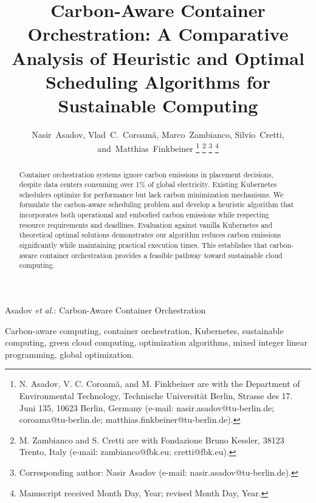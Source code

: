 \documentclass[journal]{IEEEtran}
\begin{document}
\title{Carbon-Aware Container Orchestration: A Comparative Analysis of Heuristic and Optimal Scheduling Algorithms for Sustainable Computing}

\author{Nasir~Asadov,
        Vlad~C.~Coroamă,
        Marco~Zambianco,
        Silvio~Cretti,
        and~Matthias~Finkbeiner%
\thanks{N. Asadov, V. C. Coroamă, and M. Finkbeiner are with the Department
of Environmental Technology, Technische Universität Berlin, Strasse des 17. Juni 135, 10623 Berlin, Germany 
(e-mail: nasir.asadov@tu-berlin.de; coroama@tu-berlin.de; matthias.finkbeiner@tu-berlin.de).}%
\thanks{M. Zambianco and S. Cretti are with Fondazione Bruno Kessler,
38123 Trento, Italy (e-mail: zambianco@fbk.eu; cretti@fbk.eu).}%
\thanks{Corresponding author: Nasir Asadov (e-mail: nasir.asadov@tu-berlin.de).}%
\thanks{Manuscript received Month Day, Year; revised Month Day, Year.}}

%
{Asadov \MakeLowercase{\textit{et al.}}: Carbon-Aware Container Orchestration}

\maketitle

\begin{abstract}
Container orchestration systems ignore carbon emissions in placement decisions, despite data centers consuming over 1\% of global electricity. Existing Kubernetes schedulers optimize for performance but lack carbon minimization mechanisms. We formulate the carbon-aware scheduling problem and develop a heuristic algorithm that incorporates both operational and embodied carbon emissions while respecting resource requirements and deadlines. Evaluation against vanilla Kubernetes and theoretical optimal solutions demonstrates our algorithm reduces carbon emissions significantly while maintaining practical execution times. This establishes that carbon-aware container orchestration provides a feasible pathway toward sustainable cloud computing.
\end{abstract}

\begin{IEEEkeywords}
Carbon-aware computing, container orchestration, Kubernetes, sustainable computing, green cloud computing, optimization algorithms, mixed integer linear programming, global optimization.
\end{IEEEkeywords}
\end{document}
